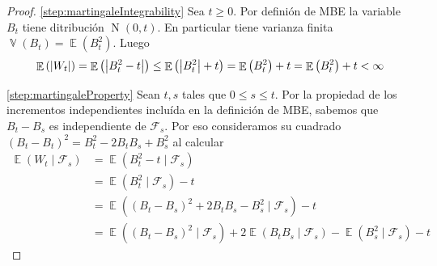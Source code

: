 \documentclass{article}
\DeclareMathOperator{\Expectation}{\mathbb{E}}
\DeclareMathOperator{\Variance}{\mathbb{V}}
\DeclareMathOperator{\normal}{N}
\newcommand{\brownian}{B}
\newcommand{\wiener}{W}
\newcommand{\events}{\mathcal{F}}
\theoremstyle{definition}
\begin{document}
\begin{proof}
\ref{step:martingaleIntegrability}
Sea \(t \geq 0\).
Por definión de MBE la variable \(\brownian_t\) tiene ditribución \(\normal(0, t)\).
En particular tiene varianza finita \(\Variance(\brownian_t) = \Expectation(\brownian_t^2)\).
Luego
\begin{align}
	\Expectation \left( \abs{\wiener_t} \right)
	=
	\Expectation \left( \abs{\brownian_t^2 - t} \right)
	\leq
	\Expectation \left( \abs{\brownian_t^2} + t \right)
	=
	\Expectation \left( \brownian_t^2 \right) + t
	=
	\Expectation \left( \brownian_t^2 \right) + t
	<
	\infty
\end{align}

\ref{step:martingaleProperty}
Sean \(t, s\) tales que \(0 \leq s \leq t\).
Por la propiedad de los incrementos independientes incluída en la definición de MBE, sabemos que \(B_t - B_s\) es independiente de \(\events_s\).
Por eso consideramos su cuadrado
\((\brownian_t - \brownian_t)^2 = \brownian_t^2 - 2 \brownian_t \brownian_s + \brownian_s^2\) al calcular
\begin{align}
	\Expectation(\wiener_t \mid \events_s)
	&=
	\Expectation \left( \brownian_t^2 - t \mid \events_s \right)
	\\
	&=
	\Expectation \left( \brownian_t^2 \mid \events_s \right) - t
	\\
	&=
	\Expectation \left( (\brownian_t - \brownian_s)^2 + 2 \brownian_t \brownian_s - \brownian_s^2 \mid \events_s \right) - t
	\\
	&=
	\Expectation \left( (\brownian_t - \brownian_s)^2 \mid \events_s \right) 
	+ 2 \Expectation \left( \brownian_t \brownian_s \mid \events_s \right) 
	- \Expectation \left( \brownian_s^2 \mid \events_s \right) 
	- t
\end{align}


\end{proof}
\end{document}

